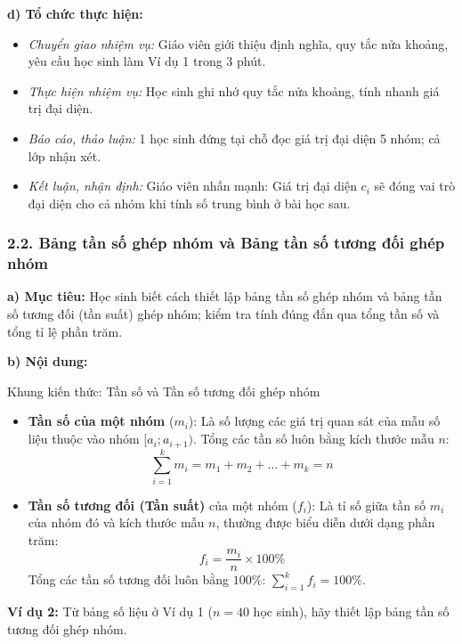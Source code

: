\documentclass[12pt, a4paper]{article}
\begin{document}
\noindent \textbf{d) Tổ chức thực hiện:}
\begin{itemize}[leftmargin=0.8cm]
    \item \textit{Chuyển giao nhiệm vụ:} Giáo viên giới thiệu định nghĩa, quy tắc nửa khoảng, yêu cầu học sinh làm Ví dụ 1 trong 3 phút.
    \item \textit{Thực hiện nhiệm vụ:} Học sinh ghi nhớ quy tắc nửa khoảng, tính nhanh giá trị đại diện.
    \item \textit{Báo cáo, thảo luận:} 1 học sinh đứng tại chỗ đọc giá trị đại diện 5 nhóm; cả lớp nhận xét.
    \item \textit{Kết luận, nhận định:} Giáo viên nhấn mạnh: Giá trị đại diện $c_i$ sẽ đóng vai trò đại diện cho cả nhóm khi tính số trung bình ở bài học sau.
\end{itemize}

\subsubsection*{2.2. Bảng tần số ghép nhóm và Bảng tần số tương đối ghép nhóm}

\noindent \textbf{a) Mục tiêu:}
Học sinh biết cách thiết lập bảng tần số ghép nhóm và bảng tần số tương đối (tần suất) ghép nhóm; kiểm tra tính đúng đắn qua tổng tần số và tổng tỉ lệ phần trăm.

\noindent \textbf{b) Nội dung:}
\begin{pedabox}{Khung kiến thức: Tần số và Tần số tương đối ghép nhóm}
\begin{itemize}[leftmargin=0.6cm]
    \item \textbf{Tần số của một nhóm} ($m_i$): Là số lượng các giá trị quan sát của mẫu số liệu thuộc vào nhóm $[a_i; a_{i+1})$. Tổng các tần số luôn bằng kích thước mẫu $n$:
    $$\sum_{i=1}^k m_i = m_1 + m_2 + \dots + m_k = n$$
    \item \textbf{Tần số tương đối (Tần suất)} của một nhóm ($f_i$): Là tỉ số giữa tần số $m_i$ của nhóm đó và kích thước mẫu $n$, thường được biểu diễn dưới dạng phần trăm:
    $$f_i = \dfrac{m_i}{n} \times 100\%$$
    Tổng các tần số tương đối luôn bằng $100\%$: $\sum_{i=1}^k f_i = 100\%$.
\end{itemize}
\end{pedabox}

\textbf{Ví dụ 2:} Từ bảng số liệu ở Ví dụ 1 ($n = 40$ học sinh), hãy thiết lập bảng tần số tương đối ghép nhóm.
\end{document}
